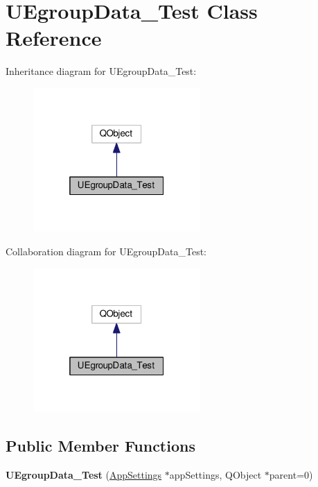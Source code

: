 \hypertarget{class_u_egroup_data___test}{}\section{U\+Egroup\+Data\+\_\+\+Test Class Reference}
\label{class_u_egroup_data___test}


Inheritance diagram for U\+Egroup\+Data\+\_\+\+Test\+:
\nopagebreak
\begin{figure}[H]
\begin{center}
\leavevmode
\includegraphics[width=181pt]{class_u_egroup_data___test__inherit__graph}
\end{center}
\end{figure}


Collaboration diagram for U\+Egroup\+Data\+\_\+\+Test\+:
\nopagebreak
\begin{figure}[H]
\begin{center}
\leavevmode
\includegraphics[width=181pt]{class_u_egroup_data___test__coll__graph}
\end{center}
\end{figure}
\subsection*{Public Member Functions}
\begin{DoxyCompactItemize}
\item 
{\bfseries U\+Egroup\+Data\+\_\+\+Test} (\hyperlink{class_app_settings}{App\+Settings} $\ast$app\+Settings, Q\+Object $\ast$parent=0)\hypertarget{class_u_egroup_data___test_a2dbe510de0b322f820935cda1588d784}{}\label{class_u_egroup_data___test_a2dbe510de0b322f820935cda1588d784}

\end{DoxyCompactItemize}
